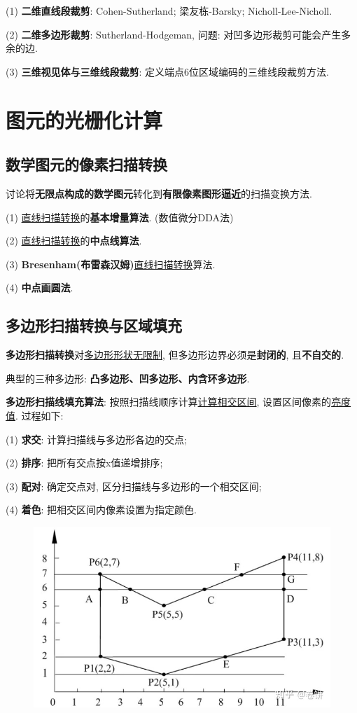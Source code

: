 \documentclass[12pt, a4paper, oneside]{ctexart}
\def\ul{\underline}         %
\def\bf{\textbf}            %
\begin{document}
(1) \bf{二维直线段裁剪}: Cohen-Sutherland; 梁友栋-Barsky; Nicholl-Lee-Nicholl.

(2) \bf{二维多边形裁剪}: Sutherland-Hodgeman, 问题: 对凹多边形裁剪可能会产生多余的边.

(3) \bf{三维视见体与三维线段裁剪}: 定义端点6位区域编码的三维线段裁剪方法.

\section{图元的光栅化计算}
\subsection{数学图元的像素扫描转换}

讨论将\bf{无限点构成的数学图元}转化到\bf{有限像素图形逼近}的扫描变换方法.

(1) \ul{直线扫描转换}的\bf{基本增量算法}. (数值微分DDA法)

(2) \ul{直线扫描转换}的\bf{中点线算法}.

(3) \bf{Bresenham(布雷森汉姆)}\ul{直线扫描转换}算法.

(4) \bf{中点画圆法}.

\subsection{多边形扫描转换与区域填充}

\bf{多边形扫描转换}对\ul{多边形形状无限制}, 但多边形边界必须是\bf{封闭的}, 且\bf{不自交的}.

典型的三种多边形: \bf{凸多边形、凹多边形、内含环多边形}.

\bf{多边形扫描线填充算法}: 按照扫描线顺序计算\ul{计算相交区间}, 设置区间像素的\ul{亮度值}. 过程如下:

(1) \bf{求交}: 计算扫描线与多边形各边的交点;

(2) \bf{排序}: 把所有交点按x值递增排序;

(3) \bf{配对}: 确定交点对, 区分扫描线与多边形的一个相交区间;

(4) \bf{着色}: 把相交区间内像素设置为指定颜色.

\begin{figure}[htbp]
    \centering
    \includegraphics[scale=0.4]{多边形扫描线填充.jpg}
\end{figure}
\end{document}
